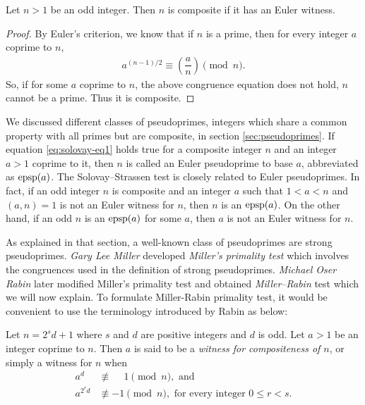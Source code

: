 \documentclass{subfiles}
\begin{document}
	\begin{theorem}
		Let $n>1$ be an odd integer. Then $n$ is composite if it has an Euler witness.
	\end{theorem}
	
	\begin{proof}
		By Euler's criterion, we know that if $n$ is a prime, then for every integer $a$ coprime to $n$,
		\begin{align}
			a^{(n-1)/2}  \equiv \left(\dfrac{a}{n}\right) \pmod n. \label{eq:solovay-eq1}
		\end{align}
		So, if for some $a$ coprime to $n$, the above congruence equation does not hold, $n$ cannot be a prime. Thus it is composite.
	\end{proof}
	
	\begin{remark}
		We discussed different classes of pseudoprimes, integers which share a common property with all primes but are composite, in section \eqref{sec:pseudoprimes}. If equation \eqref{eq:solovay-eq1} holds true for a composite integer $n$ and an integer $a>1$ coprime to it, then $n$ is called an Euler pseudoprime to base $a$, abbreviated as $\operatorname{epsp}(a)$. The Solovay--Strassen test is closely related to Euler pseudoprimes. In fact, if an odd integer $n$ is composite and an integer $a$ such that $1<a<n$ and $(a,n)=1$ is not an Euler witness for $n$, then $n$ is an $\operatorname{epsp}(a)$. On the other hand, if an odd $n$ is an $\operatorname{epsp}(a)$ for some $a$, then $a$ is not an Euler witness for $n$.
	\end{remark}
	
	As explained in that section, a well-known class of pseudoprimes are strong pseudoprimes. \textit{Gary Lee Miller} developed \textit{Miller's primality test} which involves the congruences used in the definition of strong pseudoprimes. \textit{Michael Oser Rabin} later modified Miller's primality test and obtained \textit{Miller--Rabin} test which we will now explain. To formulate Miller-Rabin primality test, it would be convenient to use the terminology introduced by Rabin as below:
	
	\begin{definition}
		Let $n=2^sd+1$ where $s$ and $d$ are positive integers and $d$ is odd. Let $a>1$ be an integer coprime to $n$. Then $a$ is said to be a \textit{witness for compositeness of $n$}, or simply a witness for $n$ when
		\begin{align*}
			a^d &\not\equiv \phantom{-} 1 \pmod n, \text{ and}\\
			a^{2^rd} &\not\equiv -1 \pmod n, \text{ for every integer } 0 \leq r <s.
		\end{align*}
	\end{definition}
	
\end{document}
